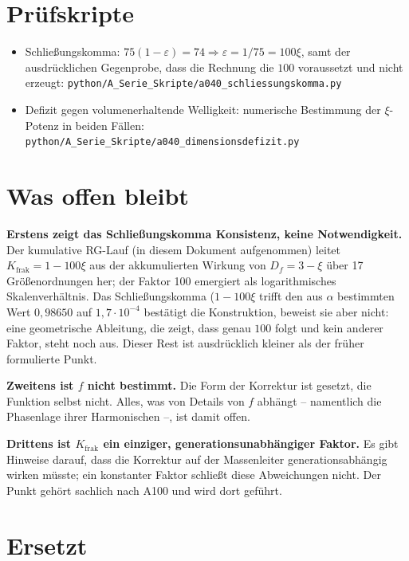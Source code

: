 \section{Prüfskripte}

\begin{itemize}
  \item Schließungskomma: $75(1-\varepsilon)=74 \Rightarrow \varepsilon =
    1/75 = 100\xi$, samt der ausdrücklichen Gegenprobe, dass die Rechnung die
    $100$ voraussetzt und nicht erzeugt:
    \texttt{python/A\_Serie\_Skripte/a040\_schliessungskomma.py}
  \item Defizit gegen volumenerhaltende Welligkeit: numerische Bestimmung der
    $\xi$-Potenz in beiden Fällen:
    \texttt{python/A\_Serie\_Skripte/a040\_dimensionsdefizit.py}
\end{itemize}

\section{Was offen bleibt}

\textbf{Erstens zeigt das Schließungskomma Konsistenz, keine Notwendigkeit.}
Der kumulative RG-Lauf (in diesem Dokument aufgenommen) leitet
$K_\text{frak}=1-100\xi$ aus der akkumulierten Wirkung von $D_f=3-\xi$ über 17
Größenordnungen her; der Faktor 100 emergiert als logarithmisches
Skalenverhältnis. Das Schließungskomma ($1-100\xi$ trifft den aus $\alpha$
bestimmten Wert $0{,}98650$ auf $1{,}7\cdot10^{-4}$ bestätigt die Konstruktion, beweist sie aber nicht: eine
geometrische Ableitung, die zeigt, dass genau $100$ folgt und kein anderer
Faktor, steht noch aus. Dieser Rest ist ausdrücklich kleiner als der früher
formulierte Punkt.

\textbf{Zweitens ist $f$ nicht bestimmt.} Die Form der Korrektur ist gesetzt,
die Funktion selbst nicht. Alles, was von Details von $f$ abhängt -- namentlich
die Phasenlage ihrer Harmonischen --, ist damit offen.

\textbf{Drittens ist $K_\text{frak}$ ein einziger, generationsunabhängiger
Faktor.} Es gibt Hinweise darauf, dass die Korrektur auf der Massenleiter
generationsabhängig wirken müsste; ein konstanter Faktor schließt diese
Abweichungen nicht. Der Punkt gehört sachlich nach A100 und wird dort geführt.

\section{Ersetzt}

